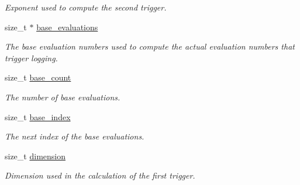 \begin{DoxyCompactItemize}
\begin{DoxyCompactList}\small\item\em Exponent used to compute the second trigger. \end{DoxyCompactList}\item 
size\+\_\+t $\ast$ \hyperlink{structcoco__observer__evaluations__t_af0caf973c6563427ef6065fffa139e6c}{base\+\_\+evaluations}\hypertarget{structcoco__observer__evaluations__t_af0caf973c6563427ef6065fffa139e6c}{}\label{structcoco__observer__evaluations__t_af0caf973c6563427ef6065fffa139e6c}

\begin{DoxyCompactList}\small\item\em The base evaluation numbers used to compute the actual evaluation numbers that trigger logging. \end{DoxyCompactList}\item 
size\+\_\+t \hyperlink{structcoco__observer__evaluations__t_a9065ef4b0edd1d653a3a675ae9b16c57}{base\+\_\+count}\hypertarget{structcoco__observer__evaluations__t_a9065ef4b0edd1d653a3a675ae9b16c57}{}\label{structcoco__observer__evaluations__t_a9065ef4b0edd1d653a3a675ae9b16c57}

\begin{DoxyCompactList}\small\item\em The number of base evaluations. \end{DoxyCompactList}\item 
size\+\_\+t \hyperlink{structcoco__observer__evaluations__t_a6c99d253b00b0ef7dd73bec5e909ea88}{base\+\_\+index}\hypertarget{structcoco__observer__evaluations__t_a6c99d253b00b0ef7dd73bec5e909ea88}{}\label{structcoco__observer__evaluations__t_a6c99d253b00b0ef7dd73bec5e909ea88}

\begin{DoxyCompactList}\small\item\em The next index of the base evaluations. \end{DoxyCompactList}\item 
size\+\_\+t \hyperlink{structcoco__observer__evaluations__t_aaaa856ff5822f179a6200d4a210d2c8e}{dimension}\hypertarget{structcoco__observer__evaluations__t_aaaa856ff5822f179a6200d4a210d2c8e}{}\label{structcoco__observer__evaluations__t_aaaa856ff5822f179a6200d4a210d2c8e}

\begin{DoxyCompactList}\small\item\em Dimension used in the calculation of the first trigger. \end{DoxyCompactList}\end{DoxyCompactItemize}


